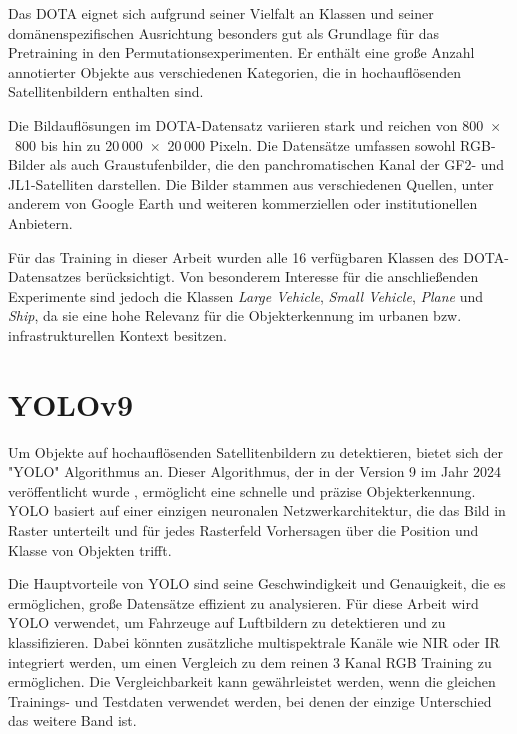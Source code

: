 Das \Acrfull{DOTA} eignet sich aufgrund seiner Vielfalt an Klassen und seiner domänenspezifischen Ausrichtung besonders gut als Grundlage für das Pretraining in den Permutationsexperimenten. Er enthält eine große Anzahl annotierter Objekte aus verschiedenen Kategorien, die in hochauflösenden Satellitenbildern enthalten sind.

Die Bildauflösungen im \acrshort{DOTA}-Datensatz variieren stark und reichen von 800~$\times$~800 bis hin zu 20\,000~$\times$~20\,000 Pixeln. Die Datensätze umfassen sowohl \acrshort{RGB}-Bilder als auch Graustufenbilder, die den panchromatischen Kanal der GF2- und JL1-Satelliten darstellen. Die Bilder stammen aus verschiedenen Quellen, unter anderem von Google Earth und weiteren kommerziellen oder institutionellen Anbietern.

Für das Training in dieser Arbeit wurden alle 16 verfügbaren Klassen des DOTA-Datensatzes berücksichtigt. Von besonderem Interesse für die anschließenden Experimente sind jedoch die Klassen \textit{Large Vehicle}, \textit{Small Vehicle}, \textit{Plane} und \textit{Ship}, da sie eine hohe Relevanz für die Objekterkennung im urbanen bzw. infrastrukturellen Kontext besitzen.




\section{YOLOv9}
Um Objekte auf hochauflösenden Satellitenbildern zu detektieren, bietet sich der "\Acrfull{YOLO}" Algorithmus an. Dieser Algorithmus, der in der Version 9 im Jahr 2024 veröffentlicht wurde \cite{yolo_v9u_github}, ermöglicht eine schnelle und präzise Objekterkennung. \acrshort{YOLO} basiert auf einer einzigen neuronalen Netzwerkarchitektur, die das Bild in Raster unterteilt und für jedes Rasterfeld Vorhersagen über die Position und Klasse von Objekten trifft. 

Die Hauptvorteile von \acrshort{YOLO} sind seine Geschwindigkeit und Genauigkeit, die es ermöglichen, große Datensätze effizient zu analysieren. Für diese Arbeit wird \acrshort{YOLO} verwendet, um Fahrzeuge auf Luftbildern zu detektieren und zu klassifizieren. Dabei könnten zusätzliche multispektrale Kanäle wie \acrshort{NIR} oder \acrshort{IR} integriert werden, um einen Vergleich zu dem reinen 3 Kanal \acrshort{RGB} Training zu ermöglichen. Die Vergleichbarkeit kann gewährleistet werden, wenn die gleichen Trainings- und Testdaten verwendet werden, bei denen der einzige Unterschied das weitere Band ist.

